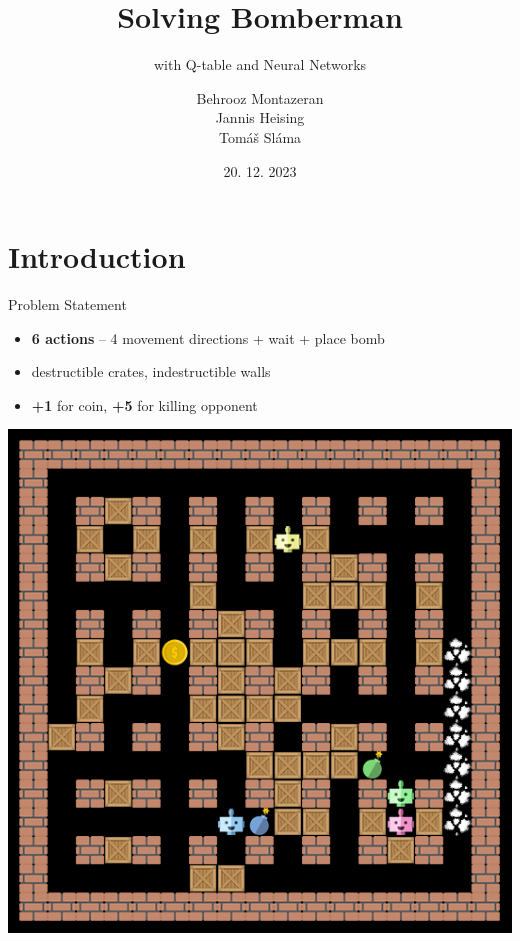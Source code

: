 \documentclass{beamer}
\title{Solving Bomberman}
\subtitle{\large with Q-table and Neural Networks}
\author{\small Behrooz Montazeran\texorpdfstring{\\}{,} Jannis Heising\texorpdfstring{\\}{,} Tomáš Sláma}
\date{20. 12. 2023}
\begin{document}
\begin{frame}
	\maketitle
\end{frame}

\section{Introduction}

\begin{frame}{Problem Statement}
	\pause

	\begin{itemize}
		\item \textbf{6 actions} -- 4 movement directions + wait + place bomb
		\item destructible crates, indestructible walls
		\item \textbf{+1} for coin, \textbf{+5} for killing opponent
	\end{itemize}
	\vfill
	\begin{center}
		\includegraphics[width=0.4\linewidth]{bomberman_example.png}
	\end{center}
\end{frame}
\end{document}
